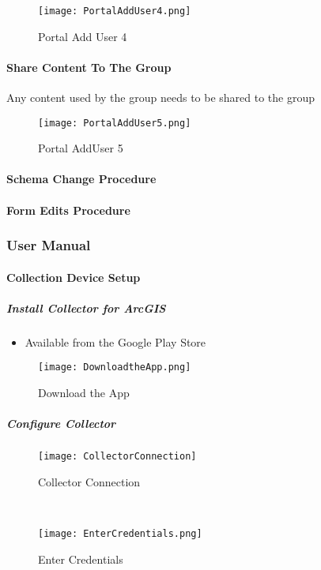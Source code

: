  \begin{figure}[h!]
 \centering
     \texttt{[image: PortalAddUser4.png]}
 \caption{Portal Add User 4}
 \end{figure}
 \clearpage
 \paragraph[Share Portal Content]{\Large Share Content To The Group\texorpdfstring{\\}{}}
 \vspace{.5in}

 \noindent Any content used by the group needs to be shared to the group
 \vspace{.5in}

 \begin{figure}[h!]
 \centering
     \texttt{[image: PortalAddUser5.png]}
 \caption{Portal AddUser 5}
 \end{figure}
 \clearpage

\paragraph{Schema Change Procedure}

 \clearpage
 \paragraph[Form Edits Procedure]{\Large Form Edits Procedure}
 \clearpage
 \subsubsection[User Manual]{\Large User Manual}
 \paragraph{Collection Device Setup}
 \subparagraph{Install Collector for ArcGIS}
 \begin{itemize}
 \item Available from the Google Play Store
 \end{itemize}
 \begin{figure}[h!]
 \centering
     \texttt{[image: DownloadtheApp.png]}
 \caption{Download the App}
 \end{figure}
 \clearpage
 \subparagraph[Configure Collector]{\Large Configure Collector}
 \begin{wrapfigure}{r}{0.5\textwidth}
 \centering
 \texttt{[image: CollectorConnection]}
 \caption{Collector Connection}

 \HRule \\[.4cm] %
 \vspace{.1in}

     \texttt{[image: EnterCredentials.png]}
 \vspace{-.1in}

 \caption{Enter Credentials}
 \end{wrapfigure}

